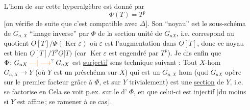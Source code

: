 L'hom de  sur cette hyperalgèbre est donné par
\[
\Phi(T)=T^p
\]
[on vérifie  de suite que c'est compatible avec $\Delta$]. Son ``noyau'' est le sous-schéma de $G_{a,X}$ ``image inverse'' par $\Phi$ de la section unité de $G_{aX}$,  i.e. correspond au quotient $\underline O[T]/\Phi(\operatorname{Ker}\varepsilon)$
où $\varepsilon$ est l'augmentation dans $\underline O[T]$, donc ce noyau est bien $\underline O[T]/T^p\underline O[T)$ (car $\operatorname{Ker}\varepsilon$ est engendré par $T^p$). Je dis enfin que  $\Phi\colon G_{aX}\mathrel{\unsure{\text{\textemdash}|\longrightarrow}}G_{aX}$ est \uline{surjectif}
\reversemarginpar{}\normalmarginpar
 sens technique suivant : Tout $X$-hom $G_{a,X}\mathrel{\longrightarrow}Y$ (où $Y$ est un préschéma sur $X$) qui est un $G_{a,X}$ hom (qud $G_{aX}$ opère sur le premier facteur grâce à $\Phi$, et sur $Y$ trivialement) est une \uline{section} de $Y$, i.e. se factorise en
Cela se voit p.ex. sur le   d' $\Phi$, en  que celui-ci est injectif [du moins si $Y$ est affine\,;   se ramener  à ce cas].


